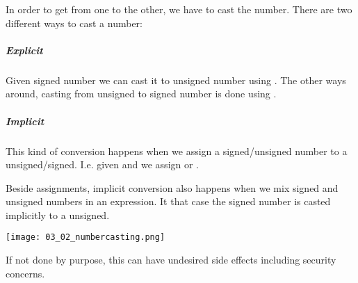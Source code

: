 In order to get from one to the other, we have to cast the number. There are two different ways to cast a number:

\subparagraph{Explicit}
Given signed number  we can cast it to unsigned number  using . The other ways around, casting from unsigned  to signed number  is done using .

\subparagraph{Implicit}
This kind of conversion happens when we assign a signed/unsigned number to a unsigned/signed. I.e. given  and we assign  or .

Beside assignments, implicit conversion also happens when we mix signed and unsigned numbers in an expression. It that case the signed number is casted implicitly to a unsigned. 

\texttt{[image: 03\_02\_numbercasting.png]}

If not done by purpose, this can have undesired side effects including security concerns.
